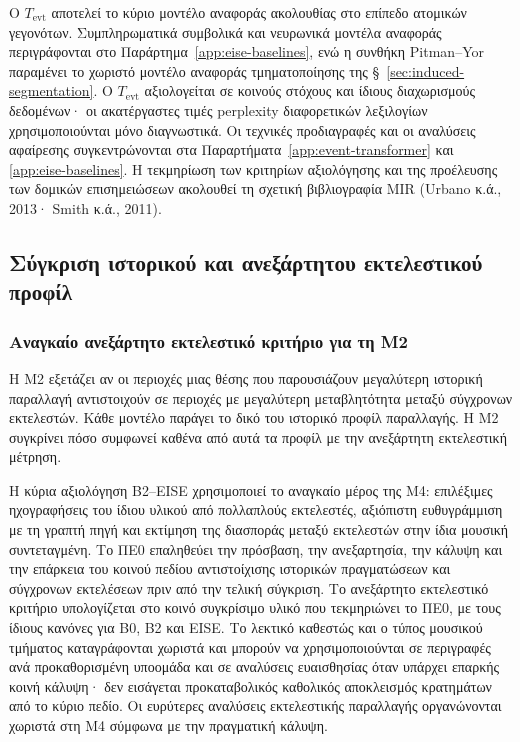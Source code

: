 \documentclass[11pt,a4paper]{article}
\begin{document}
Ο $T_{\mathrm{evt}}$ αποτελεί το κύριο μοντέλο αναφοράς ακολουθίας στο επίπεδο ατομικών γεγονότων. Συμπληρωματικά συμβολικά και νευρωνικά μοντέλα αναφοράς περιγράφονται στο Παράρτημα~\ref{app:eise-baselines}, ενώ η συνθήκη Pitman--Yor παραμένει το χωριστό μοντέλο αναφοράς τμηματοποίησης της §~\ref{sec:induced-segmentation}. Ο $T_{\mathrm{evt}}$ αξιολογείται σε κοινούς στόχους και ίδιους διαχωρισμούς δεδομένων· οι ακατέργαστες τιμές perplexity διαφορετικών λεξιλογίων χρησιμοποιούνται μόνο διαγνωστικά. Οι τεχνικές προδιαγραφές και οι αναλύσεις αφαίρεσης συγκεντρώνονται στα Παραρτήματα~\ref{app:event-transformer} και \ref{app:eise-baselines}. Η τεκμηρίωση των κριτηρίων αξιολόγησης και της προέλευσης των δομικών επισημειώσεων ακολουθεί τη σχετική βιβλιογραφία MIR (Urbano κ.ά., 2013· Smith κ.ά., 2011).

\subsection{Σύγκριση ιστορικού και ανεξάρτητου εκτελεστικού προφίλ}\label{sec:eise-transfer}

\subsubsection{Αναγκαίο ανεξάρτητο εκτελεστικό κριτήριο για τη M2}\label{sec:m4-min}

Η M2 εξετάζει αν οι περιοχές μιας θέσης που παρουσιάζουν μεγαλύτερη ιστορική παραλλαγή αντιστοιχούν σε περιοχές με μεγαλύτερη μεταβλητότητα μεταξύ σύγχρονων εκτελεστών. Κάθε μοντέλο παράγει το δικό του ιστορικό προφίλ παραλλαγής. Η M2 συγκρίνει πόσο συμφωνεί καθένα από αυτά τα προφίλ με την ανεξάρτητη εκτελεστική μέτρηση.

Η κύρια αξιολόγηση B2--EISE χρησιμοποιεί το αναγκαίο μέρος της M4: επιλέξιμες ηχογραφήσεις του ίδιου υλικού από πολλαπλούς εκτελεστές, αξιόπιστη ευθυγράμμιση με τη γραπτή πηγή και εκτίμηση της διασποράς μεταξύ εκτελεστών στην ίδια μουσική συντεταγμένη. Το ΠΕ0 επαληθεύει την πρόσβαση, την ανεξαρτησία, την κάλυψη και την επάρκεια του κοινού πεδίου αντιστοίχισης ιστορικών πραγματώσεων και σύγχρονων εκτελέσεων πριν από την τελική σύγκριση. Το ανεξάρτητο εκτελεστικό κριτήριο υπολογίζεται στο κοινό συγκρίσιμο υλικό που τεκμηριώνει το ΠΕ0, με τους ίδιους κανόνες για B0, B2 και EISE. Το λεκτικό καθεστώς και ο τύπος μουσικού τμήματος καταγράφονται χωριστά και μπορούν να χρησιμοποιούνται σε περιγραφές ανά προκαθορισμένη υποομάδα και σε αναλύσεις ευαισθησίας όταν υπάρχει επαρκής κοινή κάλυψη· δεν εισάγεται προκαταβολικός καθολικός αποκλεισμός κρατημάτων από το κύριο πεδίο. Οι ευρύτερες αναλύσεις εκτελεστικής παραλλαγής οργανώνονται χωριστά στη M4 σύμφωνα με την πραγματική κάλυψη.
\end{document}
